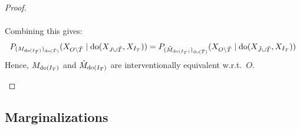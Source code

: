 \begin{proof}
\begin{enumerate}[resume*]
\begin{align*}
  \end{align*}
  Combining this gives:
  $$
   P_{(M_{\operatorname{do}(I_T)})_{\operatorname{do}(\tilde{T})}}(X_{O\setminus\tilde{T}} \mid \operatorname{do}(X_{J\cup\tilde{T}},X_{I_T})) 
   = 
   P_{(\tilde{M}_{\operatorname{do}(I_T)})_{\operatorname{do}(\tilde{T})}}(X_{O\setminus\tilde{T}} \mid \operatorname{do}(X_{\tilde{J}\cup\tilde{T}},X_{I_T})) $$
   Hence, $M_{\operatorname{do}(I_T)}$ and $\tilde{M}_{\operatorname{do}(I_T)}$ are interventionally equivalent w.r.t.\ $O$.
  \end{enumerate}
\end{proof}

\subsection{Marginalizations}

